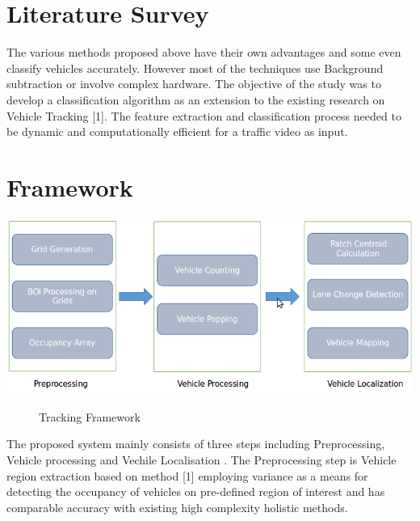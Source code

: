 \documentclass[a4paper,12pt]{article}
\begin{document}
\section{Literature Survey}

\begin{flushleft}
	The various methods proposed above have their own advantages and some even classify vehicles accurately. However most of the techniques use Background subtraction or involve complex hardware. The objective of the study was to develop a classification algorithm as an extension to the existing research on Vehicle Tracking [1]. The feature extraction and classification process needed to be dynamic and computationally efficient for a traffic video as input.
\end{flushleft}


\newpage

\section{Framework}
\centering
\vspace{0.25in}
\includegraphics[scale= 0.425]{Fig1}
\vspace{0.15in}

\begin{figure}[!ht]
\centering
\caption{Tracking Framework}
\end{figure}
\vspace{0.07in}

\begin{flushleft}
The proposed system mainly consists of three steps including Preprocessing, Vehicle processing and Vechile Localisation . The Preprocessing step is Vehicle region extraction based on method [1] employing variance as a means for detecting the occupancy of vehicles on pre-defined region of interest and has comparable accuracy with existing high complexity holistic methods.
\end{flushleft}
\end{document}
